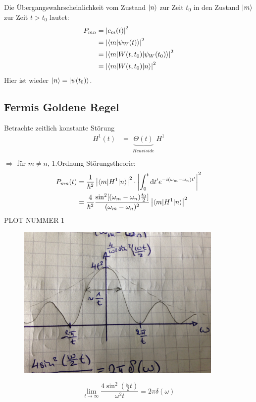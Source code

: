 	Die Übergangswahrscheinlichkeit vom Zustand $\ket{n}$ zur Zeit $t_0$ in den Zustand $\ket{m}$ zur Zeit $t>t_0$ lautet:
		\begin{align*}
			P_{mn} &= \left| c_m(t) \right|^2 \\
			&= \left| \braket{m | \psi_W(t)} \right|^2 \\
			&= \left| \braket{m | W(t,t_0) | \psi_W(t_0)} \right|^2 \\
			&= \left| \braket{m | W(t,t_0) | n}\right|^2
		\end{align*}
	Hier ist wieder $\ket{n} = \ket{\psi(t_0)}$.
\subsection{Fermis Goldene Regel}
	Betrachte zeitlich konstante Störung
		\begin{align*}
			H^1(t) &= \underbrace{\Theta (t)}_{\substack{Heaviside}} H^1 \\
		\end{align*}
	$\Rightarrow$ für $m \neq n$, 1.Ordnung Störungstheorie:
		\begin{align*}
			P_{mn}(t) 
			&= \frac{1}{\hbar^2} \left| \braket{m | H^1 | n}\right|^2 
			\cdot \left| \int_{0}^{t} \mathrm{d} t' e^{-i(\omega_m-\omega_n) t'} \right|^2 \\
			&= \frac{4}{\hbar^2} \frac{\sin^2[(\omega_m-\omega_n)
			\frac{t_0}{2}]}{(\omega_m-\omega_n)^2} 
			\left| \braket{m | H^1 | n}\right|^2
		\end{align*}
	PLOT NUMMER 1
	\begin{figure} [h]
		\begin{center}
			\includegraphics[width=10cm]{Ersatzgraph1.jpg}
		\end{center}
	\end{figure}
		\begin{equation*}
			\lim\limits_{t \rightarrow \infty} \frac{4 \sin^2(\frac{\omega}{2} t)}{\omega^2 t} = 2 \pi \delta (\omega)
		\end{equation*}
